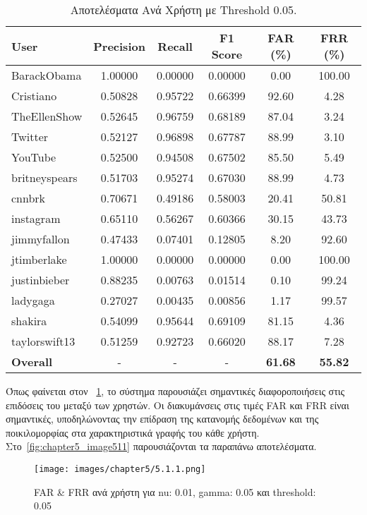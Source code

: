 \begin{table}[H]
\centering
\begin{tabular}{|l|c|c|c|c|c|}
\hline
\textbf{User} & \textbf{Precision} & \textbf{Recall} & \textbf{F1 Score} & \textbf{FAR (\%)} & \textbf{FRR (\%)} \\ \hline
BarackObama & 1.00000 & 0.00000 & 0.00000 & 0.00 & 100.00 \\ \hline
Cristiano & 0.50828 & 0.95722 & 0.66399 & 92.60 & 4.28 \\ \hline
TheEllenShow & 0.52645 & 0.96759 & 0.68189 & 87.04 & 3.24 \\ \hline
Twitter & 0.52127 & 0.96898 & 0.67787 & 88.99 & 3.10 \\ \hline
YouTube & 0.52500 & 0.94508 & 0.67502 & 85.50 & 5.49 \\ \hline
britneyspears & 0.51703 & 0.95274 & 0.67030 & 88.99 & 4.73 \\ \hline
cnnbrk & 0.70671 & 0.49186 & 0.58003 & 20.41 & 50.81 \\ \hline
instagram & 0.65110 & 0.56267 & 0.60366 & 30.15 & 43.73 \\ \hline
jimmyfallon & 0.47433 & 0.07401 & 0.12805 & 8.20 & 92.60 \\ \hline
jtimberlake & 1.00000 & 0.00000 & 0.00000 & 0.00 & 100.00 \\ \hline
justinbieber & 0.88235 & 0.00763 & 0.01514 & 0.10 & 99.24 \\ \hline
ladygaga & 0.27027 & 0.00435 & 0.00856 & 1.17 & 99.57 \\ \hline
shakira & 0.54099 & 0.95644 & 0.69109 & 81.15 & 4.36 \\ \hline
taylorswift13 & 0.51259 & 0.92723 & 0.66020 & 88.17 & 7.28 \\ \hline
\textbf{Overall} & - & - & - & \textbf{61.68} & \textbf{55.82} \\ \hline
\end{tabular}
\caption{Αποτελέσματα Ανά Χρήστη με Threshold 0.05.}
\label{tab:threshold_0.05_results}
\end{table}

Όπως φαίνεται στον ~\ref{tab:threshold_0.05_results}, το σύστημα παρουσιάζει σημαντικές διαφοροποιήσεις στις επιδόσεις του μεταξύ των χρηστών. Οι διακυμάνσεις στις τιμές FAR και FRR είναι σημαντικές, υποδηλώνοντας την επίδραση της κατανομής δεδομένων και της ποικιλομορφίας στα χαρακτηριστικά γραφής του κάθε χρήστη. Στο~\autoref{fig:chapter5_image511} παρουσιάζονται τα παραπάνω αποτελέσματα.

\begin{figure}[H]
    \centering
    \texttt{[image: images/chapter5/5.1.1.png]}
    \caption{FAR \& FRR ανά χρήστη για nu: 0.01, gamma: 0.05 και threshold: 0.05}
    \label{fig:chapter5_image511}
\end{figure}


